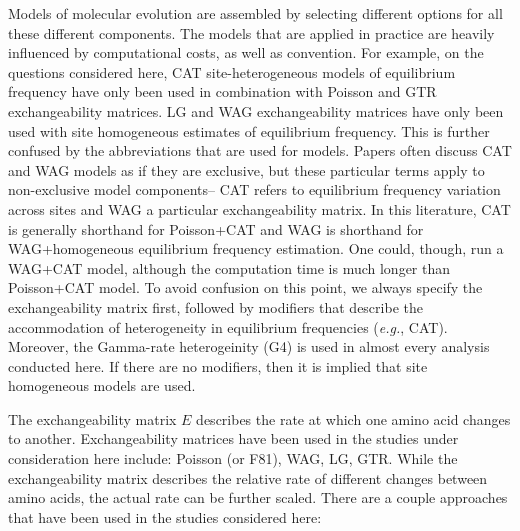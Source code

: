 \documentclass[]{article}
\begin{document}
Models of molecular evolution are assembled by selecting different
options for all these different components. The models that are applied
in practice are heavily influenced by computational costs, as well as
convention. For example, on the questions considered here, CAT
site-heterogeneous models of equilibrium frequency have only been used
in combination with Poisson and GTR exchangeability matrices. LG and WAG
exchangeability matrices have only been used with site homogeneous
estimates of equilibrium frequency. This is further confused by the
abbreviations that are used for models. Papers often discuss CAT and WAG
models as if they are exclusive, but these particular terms apply to
non-exclusive model components-- CAT refers to equilibrium frequency
variation across sites and WAG a particular exchangeability matrix. In
this literature, CAT is generally shorthand for Poisson+CAT and WAG is
shorthand for WAG+homogeneous equilibrium frequency estimation. One
could, though, run a WAG+CAT model, although the computation time is
much longer than Poisson+CAT model. To avoid confusion on this point, we
always specify the exchangeability matrix first, followed by modifiers
that describe the accommodation of heterogeneity in equilibrium
frequencies (\emph{e.g.}, CAT). Moreover, the Gamma-rate heterogeinity
(G4) is used in almost every analysis conducted here. If there are no
modifiers, then it is implied that site homogeneous models are used.

The exchangeability matrix \(E\) describes the rate at which one amino
acid changes to another. Exchangeability matrices have been used in the
studies under consideration here include: Poisson (or F81), WAG, LG,
GTR. While the exchangeability matrix describes the relative rate of
different changes between amino acids, the actual rate can be further
scaled. There are a couple approaches that have been used in the studies
considered here:
\end{document}
